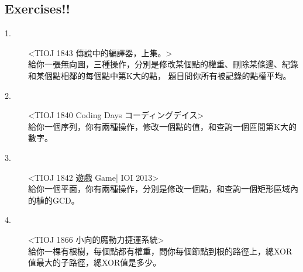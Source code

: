 \documentclass{article}
\begin{document}
\subsection{Exercises!!}
\begin{description}
\item[ 1.]<TIOJ 1843 傳說中的編譯器，上集。>\\
給你一張無向圖，三種操作，分別是修改某個點的權重、刪除某條邊、紀錄和某個點相鄰的每個點中第K大的點，
題目問你所有被記錄的點權平均。
\item[ 2.]<TIOJ 1840 Coding Days コーディングデイス>\\
給你一個序列，你有兩種操作，修改一個點的值，和查詢一個區間第K大的數字。
\item[ 3.]<TIOJ 1842 遊戲 Game| IOI 2013>\\
給你一個平面，你有兩種操作，分別是修改一個點，和查詢一個矩形區域內的植的GCD。
\item[ 4.]<TIOJ 1866 小向的魔動力捷運系統>\\
給你一棵有根樹，每個點都有權重，問你每個節點到根的路徑上，總XOR值最大的子路徑，總XOR值是多少。
\end{description}
\end{document}
